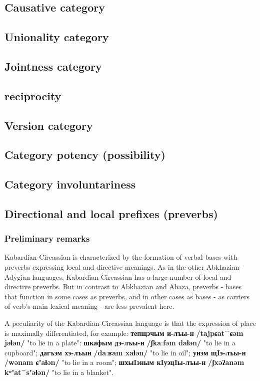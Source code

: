 \documentclass[a4paper,12pt]{book}
\newcommand{\1}[1]{\textbf{\emph{#1}}} %
\newcommand{\2}[1]{\textbf{[#1]}} %
\newcommand{\3}[1]{\fontsize{11pt}{0cm}\textbf{\emph{#1}}} %
\newcommand{\4}[1]{\fontsize{10pt}{0cm}\emph{#1}}	%
\newcommand{\5}[1]{\textbf{/#1/}} %
\newcommand{\6}[1]{\textbf{[#1]}} %
\newcommand{\7}[1]{\fontsize{12pt}{0cm}\emph{#1}} %
\newcommand{\8}[1]{\fontsize{12pt}{0cm}`#1'} %
\newcommand{\9}[1]{\fontsize{12pt}{0cm}(lit. `#1')} %
\newcommand{\glossphonemics}[1]{\textbf{/#1/}} %
\begin{document}
\subsection{Causative category}
\subsection{Unionality category}
\subsection{Jointness category}
\subsection{reciprocity}
\subsection{Version category}
\subsection{Category potency (possibility)}
\subsection{Category involuntariness}
\subsection{Directional and local prefixes (preverbs)}
\subsubsection{Preliminary remarks}
Kabardian-Circassian is characterized by the formation of verbal bases with preverbs expressing local and directive meanings. As in the other Abkhazian-Adygian languages, Kabardian-Circassian has a large number of local and directive preverbs. But in contrast to Abkhazian and Abaza, preverbs - bases that function in some cases as preverbs, and in other cases as bases - as carriers of verb's main lexical meaning - are less prevalent here.

A peculiarity of the Kabardian-Circassian language is that the expression of place is maximally differentiated, for example: \textbf{тепщэчым и-лъы-н} \glossphonemics{tajpɕat⁀ɕəm jəɬən} "to lie in a plate": \textbf{шкафым дэ-лъы-н} \glossphonemics{ʃkaːfəm daɬən} "to lie in a cupboard"; \textbf{дагъэм хэ-лъын} \glossphonemics{daːʁam xaɬən} "to lie in oil"; \textbf{унэм щIэ-лъы-н} \glossphonemics{wənam ɕʼaɬən} "to lie in a room"; \textbf{шхыIэным кIуэцIы-лъы-н} \glossphonemics{ʃxəʔanəm kʷʼat⁀sʼəɬən} "to lie in a blanket".
\end{document}
